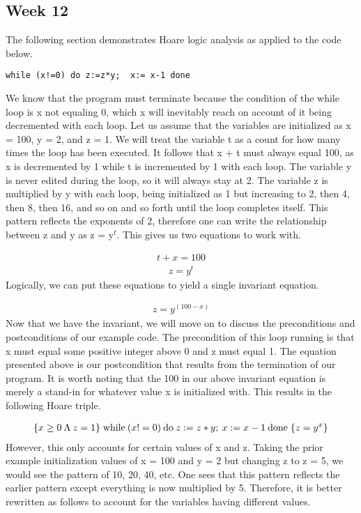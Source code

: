 \documentclass{article}
\theoremstyle{theorem}
\theoremstyle{definition}
\theoremstyle{remark}
\begin{document}
\subsection{Week 12}
The following section demonstrates Hoare logic analysis as applied to the code below.

\begin{lstlisting}
while (x!=0) do z:=z*y;  x:= x-1 done
\end{lstlisting}
%
We know that the program must terminate because the condition of the while loop is x not equaling 0, which x will inevitably reach on account of it being decremented with each loop. Let us assume that the variables are initialized as x = 100, y = 2, and z = 1. We will treat the variable t as a count for how many times the loop has been executed. It follows that x + t must always equal 100, as x is decremented by 1 while t is incremented by 1 with each loop. The variable y is never edited during the loop, so it will always stay at 2. The variable z is multiplied by y with each loop, being initialized as 1 but increasing to 2, then 4, then 8, then 16, and so on and so forth until the loop completes itself. This pattern reflects the exponents of 2, therefore one can write the relationship between z and y as z = y$^t$. This gives us two equations to work with.

\begin{align*}
t + x = 100
\end{align*}
\begin{align*}
z = y^t
\end{align*}
%
Logically, we can put these equations to yield a single invariant equation.

\begin{align*}
z = y^{(100 - x)}
\end{align*}
%
Now that we have the invariant, we will move on to discuss the preconditions and postconditions of our example code. The precondition of this loop running is that x must equal some positive integer above 0 and z must equal 1. The equation presented above is our postcondition that results from the termination of our program. It is worth noting that the 100 in our above invariant equation is merely a stand-in for whatever value x is initialized with. This results in the following Hoare triple.

\begin{align*}
\{x \ge 0 \: \Lambda \: z = 1\} \; {\rm while} \: (x!=0) \: {\rm do} \: z:=z*y; \: x:= x-1 \: {\rm done} \; \{z = y^x\}
\end{align*}
%
However, this only accounts for certain values of x and z. Taking the prior example initialization values of x = 100 and y = 2 but changing z to z =  5, we would see the pattern of 10, 20, 40, etc. One sees that this pattern reflects the earlier pattern except everything is now multiplied by 5. Therefore, it is better rewritten as follows to account for the variables having different values.
\end{document}
